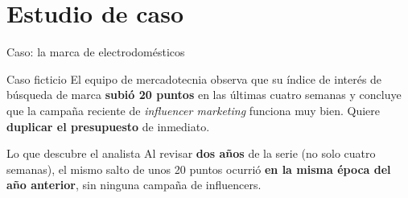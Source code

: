 \documentclass[aspectratio=169,xcolor=dvipsnames]{beamer}
\begin{document}
\section[Caso]{Estudio de caso}

\begin{frame}{Caso: la marca de electrodomésticos}
\begin{exampleblock}{Caso ficticio}
  El equipo de mercadotecnia observa que su índice de interés de búsqueda de marca \textbf{subió 20 puntos} en las últimas cuatro semanas y concluye que la campaña reciente de \textit{influencer marketing} funciona muy bien. Quiere \textbf{duplicar el presupuesto} de inmediato.
\end{exampleblock}
\begin{alertblock}{Lo que descubre el analista}
  \small Al revisar \textbf{dos años} de la serie (no solo cuatro semanas), el mismo salto de unos 20 puntos ocurrió \textbf{en la misma época del año anterior}, sin ninguna campaña de influencers.
\end{alertblock}
\end{frame}
\end{document}
